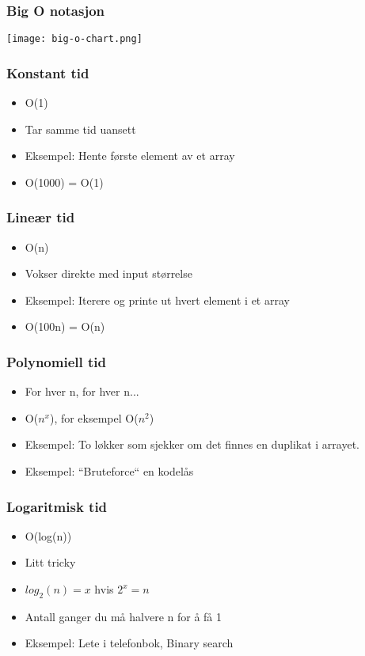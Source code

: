 \documentclass[norsk, handout]{beamer}
\begin{document}
    \begin{frame}
        \frametitle{Big O notasjon}
        \texttt{[image: big-o-chart.png]}
    \end{frame}

    \begin{frame}
        \frametitle{Konstant tid}
        \begin{itemize}
            \item O(1)
            \item Tar samme tid uansett
            \item Eksempel: Hente første element av et array
            \item O(1000) = O(1)
        \end{itemize}
    \end{frame}

    \begin{frame}
        \frametitle{Lineær tid}

        \begin{itemize}
            \item O(n)
            \item Vokser direkte med input størrelse
            \item Eksempel: Iterere og printe ut hvert element i et array
            \item O(100n) = O(n)
        \end{itemize}

    \end{frame}

    \begin{frame}
        \frametitle{Polynomiell tid}

        \begin{itemize}
            \item For hver n, for hver n...
            \item O($n^x$), for eksempel O($n^2$)
            \item Eksempel: To løkker som sjekker om det finnes en duplikat i arrayet.
            \item Eksempel: ``Bruteforce`` en kodelås
        \end{itemize}
    \end{frame}

    \begin{frame}
        \frametitle{Logaritmisk tid}

        \begin{itemize}
            \item O(log(n))
            \item Litt tricky
            \item $log_2(n) = x$ hvis $2^x = n$
            \item Antall ganger du må halvere n for å få 1
            \item Eksempel: Lete i telefonbok, Binary search
        \end{itemize}
    \end{frame}
\end{document}
